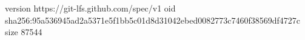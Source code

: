 version https://git-lfs.github.com/spec/v1
oid sha256:95a536945ad2a5371e5f1bb5c01d8d31042ebed0082773c7460f38569df4727c
size 87544

